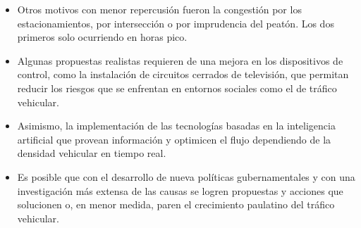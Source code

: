 \documentclass[12pt]{article}
\begin{document}
\begin{itemize}
        \item Otros motivos con menor repercusión fueron la congestión por los estacionamientos, por intersección o por imprudencia del peatón. Los dos primeros solo ocurriendo en horas pico.
        \item Algunas propuestas realistas requieren de una mejora en los dispositivos de control, como la instalación de circuitos cerrados de televisión, que permitan reducir los riesgos que se enfrentan en entornos sociales como el de tráfico vehicular. 
        \item Asimismo, la implementación de las tecnologías basadas en la inteligencia artificial que provean información y optimicen el flujo dependiendo de la densidad vehicular en tiempo real.
        \item Es posible que con el desarrollo de nueva políticas gubernamentales y con una investigación más extensa de las causas se logren propuestas y acciones que solucionen o, en menor medida, paren el crecimiento paulatino del tráfico vehicular.
    \end{itemize}
\end{document}
